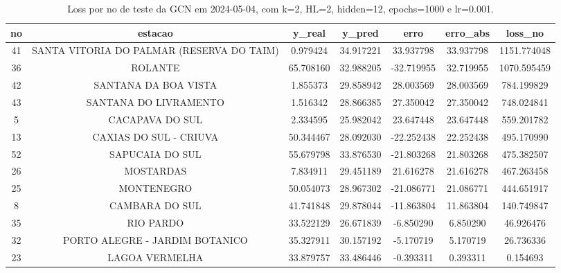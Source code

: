 \begin{table}[h]
\centering
\caption{Loss por no de teste da GCN em 2024-05-04, com k=2, HL=2, hidden=12, epochs=1000 e lr=0.001.}
\label{tab:gcn_loss_k2_hl2_h12_e1000_d20240504}
\begin{tabular}{ccccccc}
\toprule
no & estacao & y\_real & y\_pred & erro & erro\_abs & loss\_no \\
\midrule
41 & SANTA VITORIA DO PALMAR (RESERVA DO TAIM) & 0.979424 & 34.917221 & 33.937798 & 33.937798 & 1151.774048 \\
36 & ROLANTE & 65.708160 & 32.988205 & -32.719955 & 32.719955 & 1070.595459 \\
42 & SANTANA DA BOA VISTA & 1.855373 & 29.858942 & 28.003569 & 28.003569 & 784.199829 \\
43 & SANTANA DO LIVRAMENTO & 1.516342 & 28.866385 & 27.350042 & 27.350042 & 748.024841 \\
5 & CACAPAVA DO SUL & 2.334595 & 25.982042 & 23.647448 & 23.647448 & 559.201782 \\
13 & CAXIAS DO SUL - CRIUVA & 50.344467 & 28.092030 & -22.252438 & 22.252438 & 495.170990 \\
52 & SAPUCAIA DO SUL & 55.679798 & 33.876530 & -21.803268 & 21.803268 & 475.382507 \\
26 & MOSTARDAS & 7.834911 & 29.451189 & 21.616278 & 21.616278 & 467.263458 \\
25 & MONTENEGRO & 50.054073 & 28.967302 & -21.086771 & 21.086771 & 444.651917 \\
8 & CAMBARA DO SUL & 41.741848 & 29.878044 & -11.863804 & 11.863804 & 140.749847 \\
35 & RIO PARDO & 33.522129 & 26.671839 & -6.850290 & 6.850290 & 46.926476 \\
32 & PORTO ALEGRE - JARDIM BOTANICO & 35.327911 & 30.157192 & -5.170719 & 5.170719 & 26.736336 \\
23 & LAGOA VERMELHA & 33.879757 & 33.486446 & -0.393311 & 0.393311 & 0.154693 \\
\bottomrule
\end{tabular}
\end{table}
